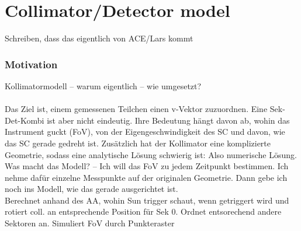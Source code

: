 %
%
%
\section{Collimator/Detector model}
Schreiben, dass das eigentlich von ACE/Lars kommt

\subsubsection{Motivation}
Kollimatormodell -- warum eigentlich -- wie umgesetzt?\\ \\
Das Ziel ist, einem gemessenen Teilchen einen v-Vektor zuzuordnen. Eine Sek-Det-Kombi ist aber nicht eindeutig. Ihre Bedeutung hängt davon ab, wohin das Instrument guckt (FoV), von der Eigengeschwindigkeit des SC und davon, wie das SC gerade gedreht ist. Zusätzlich hat der Kollimator eine komplizierte Geometrie, sodass eine analytische Lösung schwierig ist: Also numerische Lösung. \\
Was macht das Modell? -- Ich will das FoV zu jedem Zeitpunkt bestimmen. Ich nehme dafür einzelne Messpunkte auf der originalen Geometrie. Dann gebe ich noch ins Modell, wie das gerade ausgerichtet ist.\\
Berechnet anhand des AA, wohin Sun trigger schaut, wenn getriggert wird und rotiert coll. an entsprechende Position für Sek 0. Ordnet entsorechend andere Sektoren an.
Simuliert FoV durch Punkteraster \\
